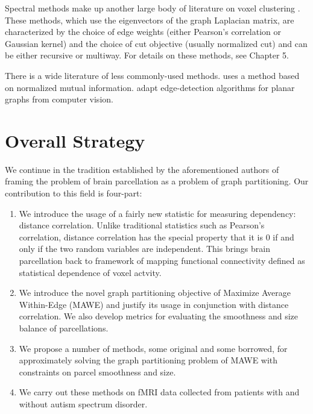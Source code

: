 Spectral methods make up another large body of literature on voxel
clustering \cite{craddock2012whole, van2008normalized, shen2010graph,
newman2006modularity, shen2013groupwise, zhang2014robust}.
These methods, which use the eigenvectors of the graph Laplacian matrix,
are characterized by the choice of edge weights (either Pearson's
correlation or Gaussian kernel) and the choice of cut objective
(usually normalized cut) and can be either recursive or multiway.
For details on these methods, see Chapter 5.

There is a wide literature of less commonly-used methods.
\cite{alexander2012discovery} uses a method based on normalized mutual
information.
\cite{cohen2008defining, gordon2014generation, barnes2011parcellation}
adapt edge-detection algorithms for planar graphs from computer vision.

\section{Overall Strategy}
We continue in the tradition established by the aforementioned authors
of framing the problem of brain parcellation as a problem of graph
partitioning. Our contribution to this field is four-part:

\begin{enumerate}
\item
We introduce the usage of a fairly new statistic for measuring
dependency: distance correlation. Unlike traditional statistics such
as Pearson's correlation, distance correlation has the special property
that it is 0 if and only if the two random variables are independent.
This brings brain parcellation back to framework of mapping functional
connectivity defined as statistical dependence of voxel actvity.

\item
We introduce the novel graph partitioning objective of Maximize Average
Within-Edge (MAWE) and justify its usage in conjunction with distance
correlation. We also develop metrics for evaluating the smoothness and
size balance of parcellations.

\item
We propose a number of methods, some original and some borrowed, for
approximately solving the graph partitioning problem of MAWE with
constraints on parcel smoothness and size.

\item
We carry out these methods on fMRI data collected from patients with
and without autism spectrum disorder.
\end{enumerate}

